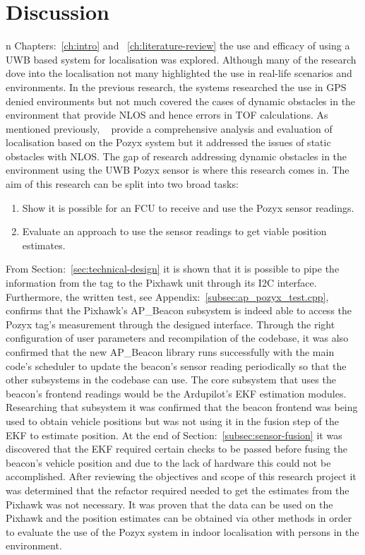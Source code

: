 \chapter{Discussion}\label{ch:discussion}
n Chapters:~\ref{ch:intro} and ~\ref{ch:literature-review} the use and efficacy of using a UWB based system for localisation was explored.
Although many of the research dove into the localisation not many highlighted the use in real-life scenarios and environments.
In the previous research, the systems researched the use in GPS denied environments but not much covered the cases of dynamic obstacles in the environment that provide NLOS and hence errors in TOF calculations.
As mentioned previously, ~\citet{evaluwb} provide a comprehensive analysis and evaluation of localisation based on the Pozyx system but it addressed the issues of static obstacles with NLOS.
The gap of research addressing dynamic obstacles in the environment using the UWB Pozyx sensor is where this research comes in.
The aim of this research can be split into two broad tasks:
\begin{enumerate}
    \item Show it is possible for an FCU to receive and use the Pozyx sensor readings.
    \item Evaluate an approach to use the sensor readings to get viable position estimates.
\end{enumerate}

From Section:~\ref{sec:technical-design} it is shown that it is possible to pipe the information from the tag to the Pixhawk unit through its I2C interface.
Furthermore, the written test, see Appendix:~\ref{subsec:ap_pozyx_test.cpp}, confirms that the Pixhawk's AP\_Beacon subsystem is indeed able to access the Pozyx tag's measurement through the designed interface.
Through the right configuration of user parameters and recompilation of the codebase, it was also confirmed that the new AP\_Beacon library runs successfully with the main code's scheduler to update the beacon's sensor reading periodically so that the other subsystems in the codebase can use.
The core subsystem that uses the beacon's frontend readings would be the Ardupilot's EKF estimation modules.
Researching that subsystem it was confirmed that the beacon frontend was being used to obtain vehicle positions but was not using it in the fusion step of the EKF to estimate position.
At the end of Section:~\ref{subsec:sensor-fusion} it was discovered that the EKF required certain checks to be passed before fusing the beacon's  vehicle position and due to the lack of hardware this could not be accomplished.
After reviewing the objectives and scope of this research project it was determined that the refactor required needed to get the estimates from the Pixhawk was not necessary.
It was proven that the data can be used on the Pixhawk and the position estimates can be obtained via other methods in order to evaluate the use of the Pozyx system in indoor localisation with persons in the environment.

